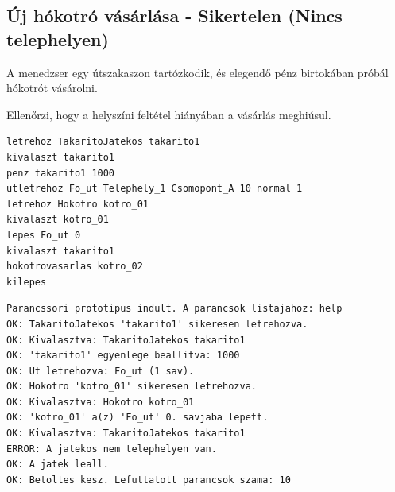 \subsection{Új hókotró vásárlása - Sikertelen (Nincs telephelyen)}
\begin{test-case-description}
    A menedzser egy útszakaszon tartózkodik, és elegendő pénz birtokában próbál hókotrót vásárolni.
\end{test-case-description}
\begin{test-case-function}
    Ellenőrzi, hogy a helyszíni feltétel hiányában a vásárlás meghiúsul.
\end{test-case-function}
\begin{test-case-input}
\begin{verbatim}
letrehoz TakaritoJatekos takarito1
kivalaszt takarito1
penz takarito1 1000
utletrehoz Fo_ut Telephely_1 Csomopont_A 10 normal 1
letrehoz Hokotro kotro_01
kivalaszt kotro_01
lepes Fo_ut 0
kivalaszt takarito1
hokotrovasarlas kotro_02
kilepes
\end{verbatim}
\end{test-case-input}
\begin{test-case-output}
\begin{verbatim}
Parancssori prototipus indult. A parancsok listajahoz: help
OK: TakaritoJatekos 'takarito1' sikeresen letrehozva.
OK: Kivalasztva: TakaritoJatekos takarito1
OK: 'takarito1' egyenlege beallitva: 1000
OK: Ut letrehozva: Fo_ut (1 sav).
OK: Hokotro 'kotro_01' sikeresen letrehozva.
OK: Kivalasztva: Hokotro kotro_01
OK: 'kotro_01' a(z) 'Fo_ut' 0. savjaba lepett.
OK: Kivalasztva: TakaritoJatekos takarito1
ERROR: A jatekos nem telephelyen van.
OK: A jatek leall.
OK: Betoltes kesz. Lefuttatott parancsok szama: 10
\end{verbatim}
\end{test-case-output}

